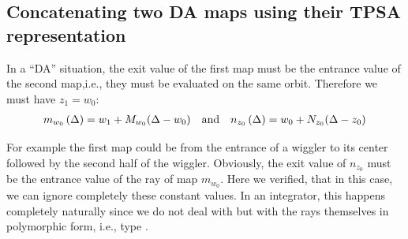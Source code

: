 \documentclass{hitec}     %
\begin{document}
{\subsection{Concatenating two DA maps using their TPSA representation}\label{s:concatda}

In a ``DA'' situation, the exit value of the first map must be the entrance value of the second map,i.e., they must be evaluated on the same orbit. Therefore we must have  ${z}_{1}={w}_{0}$:
%
\begin{align} {m}_{{w}_{0}}\left({\Delta }\right)={w}_{1}+{M}_{{w}_{0}}(\Delta -{w}_{0})~~~{\rm a}{\rm n}{\rm d} ~~~{n}_{{z}_{0}}\left({\Delta }\right)={w}_{0}+{N}_{{z}_{0}}(\Delta -{z}_{0}) \label{eq:dadatpsa} \end{align}

For example the first map could be from the entrance of a wiggler to its center followed by the second half of the wiggler. Obviously, the exit value of ${n}_{{z}_{0}}$ must be the entrance value of the ray of map  ${m}_{{w}_{0}}$.  Here we verified, that in this case, we can ignore completely these constant values. In an integrator, this happens completely naturally since we do not deal with  but with the rays themselves in polymorphic form, i.e., type . 

}
\end{document}
